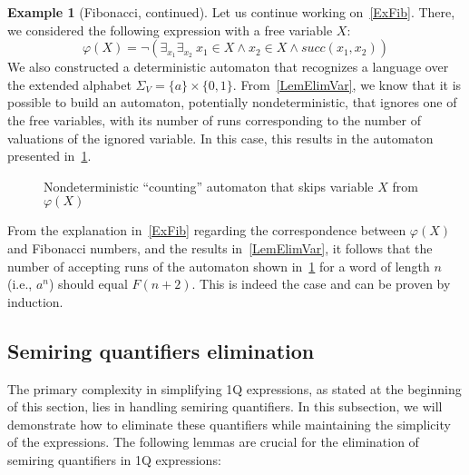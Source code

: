 \documentclass[12pt]{article}
\theoremstyle{definition}
\newtheorem{example}{Example}[section]
\begin{document}
\begin{example}[Fibonacci, continued]
\label{ExFibCont}
    Let us continue working on~\cref{ExFib}. There, we considered the following expression with a free variable $X$:
    $$\varphi(X) = \neg(\exists_{x_1}\exists_{x_2} \ x_1 \in X \land x_2 \in X \land succ(x_1, x_2))$$
    We also constructed a deterministic automaton that recognizes a language over the extended alphabet $\Sigma_V = \{a\} \times \{0,1\}$. From~\cref{LemElimVar}, we know that it is possible to build an automaton, potentially nondeterministic, that ignores one of the free variables, with its number of runs corresponding to the number of valuations of the ignored variable. In this case, this results in the automaton presented in~\cref{fig:my_label2}.

    \begin{figure}[ht]
        \centering
        \caption{Nondeterministic ``counting'' automaton that skips variable $X$ from $\varphi(X)$}
        \label{fig:my_label2}
    \end{figure}

    From the explanation in~\cref{ExFib} regarding the correspondence between $\varphi(X)$ and Fibonacci numbers, and the results in~\cref{LemElimVar}, it follows that the number of accepting runs of the automaton shown in~\cref{fig:my_label2} for a word of length $n$ (i.e., $a^n$) should equal $F(n+2)$. This is indeed the case and can be proven by induction.
\end{example}

\subsection{Semiring quantifiers elimination}
The primary complexity in simplifying 1Q expressions, as stated at the beginning of this section, lies in handling semiring quantifiers. In this subsection, we will demonstrate how to eliminate these quantifiers while maintaining the simplicity of the expressions. The following lemmas are crucial for the elimination of semiring quantifiers in 1Q expressions:
\end{document}
